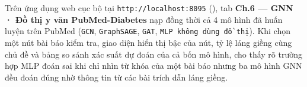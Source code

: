 Trên ứng dụng web cục bộ tại \texttt{http://localhost:8095} (), tab \textbf{Ch.6 — GNN · Đồ thị y văn PubMed-Diabetes} nạp đồng thời cả 4 mô hình đã huấn luyện trên PubMed (\texttt{GCN}, \texttt{GraphSAGE}, \texttt{GAT}, \texttt{MLP không dùng đồ thị}). Khi chọn một nút bài báo kiểm tra, giao diện hiển thị bậc của nút, tỷ lệ láng giềng cùng chủ đề và bảng so sánh xác suất dự đoán của cả bốn mô hình, cho thấy rõ trường hợp MLP đoán sai khi chỉ nhìn từ khóa của một bài báo nhưng ba mô hình GNN đều đoán đúng nhờ thông tin từ các bài trích dẫn láng giềng.


